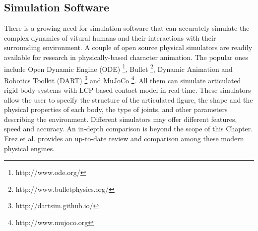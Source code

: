 \subsection{Simulation Software}

There is a growing need for simulation software that can accurately simulate the complex dynamics of vitural humans and their interactions with their surrounding environment. A couple of open source physical simulators are readily available for research in physically-based character animation. The popular ones include Open Dynamic Engine (ODE) \footnote{http://www.ode.org/}, Bullet \footnote{http://www.bulletphysics.org/}, Dynamic Animation and Robotics Toolkit (DART) \footnote{http://dartsim.github.io/} and MuJoCo \footnote{http://www.mujoco.org}. All them can simulate articulated rigid body systems with LCP-based contact model in real time. These simulators allow the user to specify the structure of the articulated figure, the shape and the physical properties of each body, the type of joints, and other parameters describing the environment. Different simulators may offer different features, speed and accuracy. An in-depth comparison is beyond the scope of this Chapter. Erez et al.\cite{ErezTT15} provides an up-to-date review and comparison among these modern physical engines.
